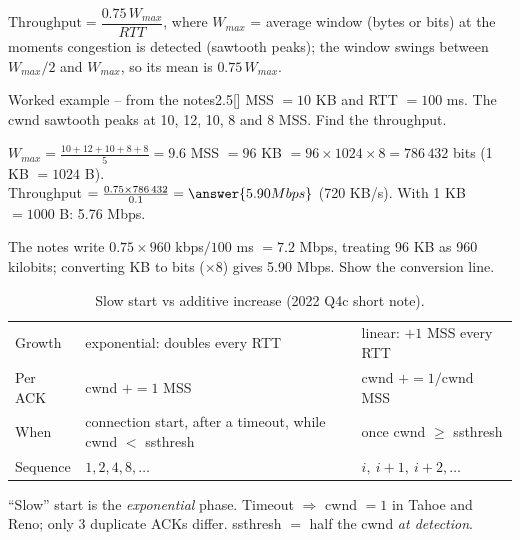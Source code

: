 \begin{formulabox}
$\text{Throughput}=\dfrac{0.75\,W_{max}}{RTT}$, where $W_{max}$ = average window (bytes or bits) at the moments congestion is detected (sawtooth peaks); the window swings between $W_{max}/2$ and $W_{max}$, so its mean is $0.75\,W_{max}$. 
\end{formulabox}

\begin{question}{Worked example -- from the notes}{2.5}[]
MSS $=10$ KB and RTT $=100$ ms. The cwnd sawtooth peaks at 10, 12, 10, 8 and 8 MSS. Find the throughput. 
\end{question}
\begin{solution}
$W_{max}=\frac{10+12+10+8+8}{5}=9.6$ MSS $=96$ KB $=96\times1024\times8=786\,432$ bits (1 KB $=1024$ B).\\
Throughput $=\frac{0.75\times786\,432}{0.1}=\answer{5.90 Mbps}$ (720 KB/s). With 1 KB $=1000$ B: 5.76 Mbps.
\end{solution}

\begin{examtip}
The notes write $0.75\times960$ kbps$/100$ ms $=7.2$ Mbps, treating 96 KB as 960 kilobits; converting KB to bits ($\times8$) gives 5.90 Mbps. Show the conversion line.
\end{examtip}

\begin{table}[H]\centering\footnotesize\zebra
\begin{tabularx}{\linewidth}{L{24mm}YY}\toprule
{} &  & \\\midrule
Growth & exponential: doubles every RTT & linear: $+1$ MSS every RTT\\
Per ACK & cwnd $+=1$ MSS & cwnd $+=1/\text{cwnd}$ MSS\\
When & connection start, after a timeout, while cwnd $<$ ssthresh & once cwnd $\ge$ ssthresh\\
Sequence & $1,2,4,8,\ldots$ & $i,\ i+1,\ i+2,\ldots$\\\bottomrule
\end{tabularx}
\caption{Slow start vs additive increase (2022 Q4c short note).}
\end{table}

\begin{warningbox}
``Slow'' start is the \emph{exponential} phase. Timeout $\Rightarrow$ cwnd $=1$ in Tahoe and Reno; only 3 duplicate ACKs differ. ssthresh $=$ half the cwnd \emph{at detection}.
\end{warningbox}

